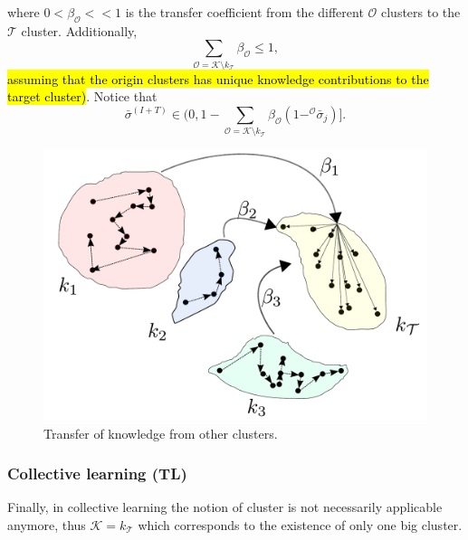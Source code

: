 where $0<\beta_\mathcal{O} << 1$ is the transfer coefficient from the different $\mathcal{O}$ clusters to the $\mathcal{T}$ cluster. Additionally,
\begin{equation}
    \sum\limits_{\mathcal{O}=\mathcal{K} \setminus k_\mathcal{T}}\beta_\mathcal{O} \leq 1,
\end{equation}
\hl{assuming that the origin clusters has unique knowledge contributions to the target cluster)}. Notice that 
\begin{equation*}
 \bar{\sigma}^{(I+T)} \in (0, 1- \sum\limits_{\mathcal{O}=\mathcal{K} \setminus k_\mathcal{T}}\beta_\mathcal{O}(1 - ^\mathcal{O}\bar{\sigma}_j)].
\end{equation*}

\begin{figure}[!h]
	\centering
	\includegraphics[width=0.9\columnwidth]{fig/cluster_knowledge_transfer.pdf}
	\caption{Transfer of knowledge from other clusters.}
	\label{fig:cluster_knowledge_transfer}
\end{figure}

\subsubsection{\textbf{Collective learning (TL)}}
Finally, in collective learning the notion of cluster is not necessarily applicable anymore, thus 
$\mathcal{K} = k_\mathcal{T}$ which corresponds to the existence of only one big cluster.



